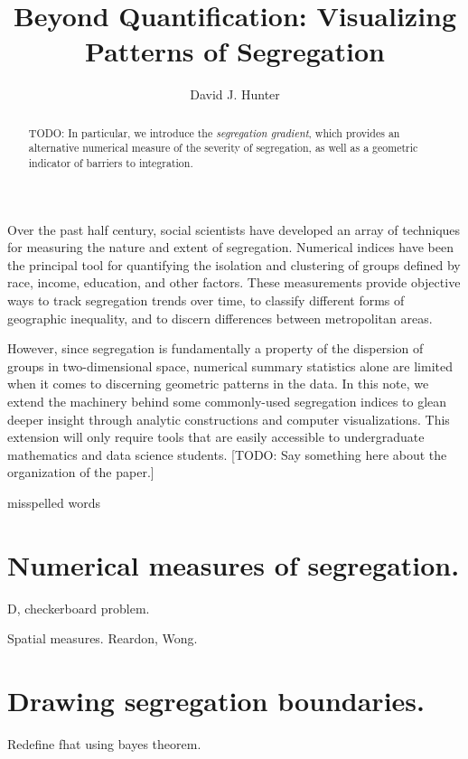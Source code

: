 \documentclass{article}
\theoremstyle{theorem}
\theoremstyle{definition}
\begin{document}
\title{Beyond Quantification: Visualizing Patterns of Segregation}
\author{David J. Hunter}

\maketitle

\begin{abstract}
  TODO: In particular, we introduce the \textit{segregation gradient}, which provides an alternative numerical measure of the severity of segregation, as well as a geometric indicator of barriers to integration.
\end{abstract}

\noindent Over the past half century, social scientists have developed an array of techniques for measuring the nature and extent of segregation. \cite{example1} Numerical indices have been the principal tool for quantifying the isolation and clustering of groups defined by race, income, education, and other factors. These measurements provide objective ways to track segregation trends over time, to classify different forms of geographic inequality, and to discern differences between metropolitan areas.

However, since segregation is fundamentally a property of the dispersion of groups in two-dimensional space, numerical summary statistics alone are limited when it comes to discerning geometric patterns in the data. In this note, we extend the machinery behind some commonly-used segregation indices to glean deeper insight through analytic constructions and computer visualizations. This extension will only require tools that are easily accessible to undergraduate mathematics and data science students.  [TODO: Say something here about the organization of the paper.]

misspelled words

\section{Numerical measures of segregation.}

D, checkerboard problem.

Spatial measures. Reardon, Wong.

\section{Drawing segregation boundaries.}

Redefine fhat using bayes theorem.
\end{document}
